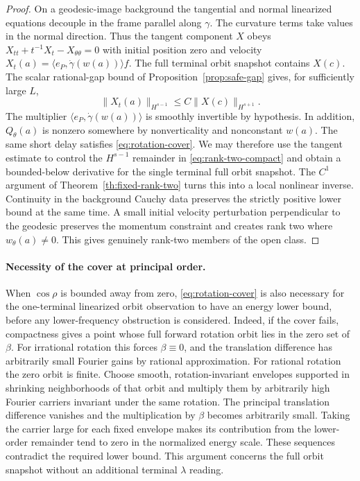\begin{proof}
On a geodesic-image background the tangential and normal
linearized equations decouple in the frame parallel along
$\gamma$. The curvature terms take values in the normal
direction. Thus the tangent component $X$ obeys
$X_{tt}+t^{-1}X_t-X_{\theta\theta}=0$ with initial
position zero and velocity
$X_t(a)=\langle e_P,\dot\gamma(w(a))\rangle f$.
The full terminal orbit snapshot contains $X(c)$.
The scalar rational-gap bound of
Proposition~\ref{prop:safe-gap} gives, for sufficiently
large $L$,
\[
 \|X_t(a)\|_{H^{s-1}}\le C\|X(c)\|_{H^{s+1}} .
\]
The multiplier $\langle e_P,\dot\gamma(w(a))\rangle$
is smoothly invertible by hypothesis. In addition,
$Q_\theta(a)$ is nonzero somewhere by nonverticality
and nonconstant $w(a)$. The same short delay satisfies
\eqref{eq:rotation-cover}. We may therefore use the
tangent estimate to control the $H^{s-1}$ remainder
in \eqref{eq:rank-two-compact} and obtain a bounded-below
derivative for the single terminal full orbit snapshot.
The $C^1$ argument of Theorem~\ref{th:fixed-rank-two}
turns this into a local nonlinear inverse. Continuity
in the background Cauchy data preserves the strictly
positive lower bound at the same time. A small initial
velocity perturbation perpendicular to the geodesic
preserves the momentum constraint and creates rank two
where $w_\theta(a)\ne0$. This gives genuinely rank-two
members of the open class.
\end{proof}

\paragraph{Necessity of the cover at principal order.}
When $\cos\rho$ is bounded away from zero,
\eqref{eq:rotation-cover} is also necessary for the
one-terminal linearized orbit observation to have an
energy lower bound, before any lower-frequency
obstruction is considered. Indeed, if the cover fails,
compactness gives a point whose full forward rotation
orbit lies in the zero set of $\beta$.
For irrational rotation this forces $\beta\equiv0$,
and the translation difference has arbitrarily small
Fourier gains by rational approximation.
For rational rotation the zero orbit is finite.
Choose smooth, rotation-invariant envelopes supported in
shrinking neighborhoods of that orbit and multiply them
by arbitrarily high Fourier carriers invariant under the
same rotation. The principal translation difference
vanishes and the multiplication by $\beta$ becomes
arbitrarily small. Taking the carrier large for each
fixed envelope makes its contribution from the
lower-order remainder tend to zero in the normalized
energy scale. These sequences contradict the required
lower bound. This argument concerns the full orbit
snapshot without an additional terminal $\lambda$ reading.
